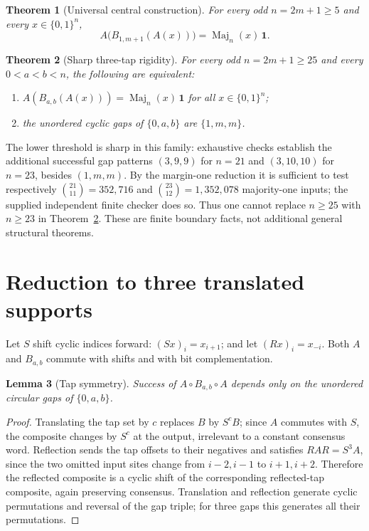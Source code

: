 \documentclass[11pt,a4paper]{article}
\newtheorem{theorem}{Theorem}
\newtheorem{lemma}[theorem]{Lemma}
\newcommand{\Maj}{\operatorname{Maj}}
\newcommand{\ind}{\boldsymbol{1}}
\begin{document}
\begin{theorem}[Universal central construction]\label{thm:central}
For every odd $n=2m+1\ge5$ and every $x\in\{0,1\}^n$,
\begin{equation}\label{eq:central}
 A\big(B_{1,m+1}(A(x))\big)=\Maj_n(x)\,\ind.
\end{equation}
\end{theorem}

\begin{theorem}[Sharp three-tap rigidity]\label{thm:rigidity}
For every odd $n=2m+1\ge25$ and every $0<a<b<n$, the following are equivalent:
\begin{enumerate}[label=(\roman*)]
\item $A(B_{a,b}(A(x)))=\Maj_n(x)\,\ind$ for all $x\in\{0,1\}^n$;
\item the unordered cyclic gaps of $\{0,a,b\}$ are $\{1,m,m\}$.
\end{enumerate}
\end{theorem}

The lower threshold is sharp in this family: exhaustive checks establish the additional successful gap patterns $(3,9,9)$ for $n=21$ and $(3,10,10)$ for $n=23$, besides $(1,m,m)$. By the margin-one reduction it is sufficient to test respectively $\binom{21}{11}=352{,}716$ and $\binom{23}{12}=1{,}352{,}078$ majority-one inputs; the supplied independent finite checker does so. Thus one cannot replace $n\ge25$ with $n\ge23$ in Theorem~\ref{thm:rigidity}. These are finite boundary facts, not additional general structural theorems.

\section{Reduction to three translated supports}
Let $S$ shift cyclic indices forward: $(Sx)_i=x_{i+1}$; and let $(Rx)_i=x_{-i}$. Both $A$ and $B_{a,b}$ commute with shifts and with bit complementation.

\begin{lemma}[Tap symmetry]\label{lem:symmetry}
Success of $A\circ B_{a,b}\circ A$ depends only on the unordered circular gaps of $\{0,a,b\}$.
\end{lemma}
\begin{proof}
Translating the tap set by $c$ replaces $B$ by $S^cB$; since $A$ commutes with $S$, the composite changes by $S^c$ at the output, irrelevant to a constant consensus word. Reflection sends the tap offsets to their negatives and satisfies $RAR=S^3A$, since the two omitted input sites change from $i-2,i-1$ to $i+1,i+2$. Therefore the reflected composite is a cyclic shift of the corresponding reflected-tap composite, again preserving consensus. Translation and reflection generate cyclic permutations and reversal of the gap triple; for three gaps this generates all their permutations.
\end{proof}
\end{document}
